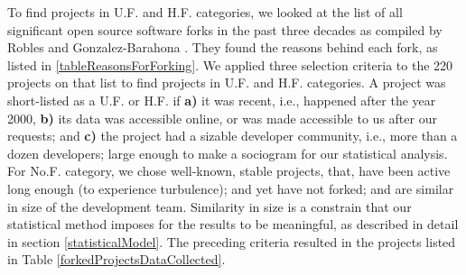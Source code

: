 \documentclass{report}
\begin{document}
To find projects in U.F. and H.F. categories, we looked at the list of all significant open source software forks in the past three decades as compiled by Robles and Gonzalez-Barahona \cite{Robles}. They found the reasons behind each fork, as listed in \ref{tableReasonsForForking}. We applied three selection criteria to the 220 projects on that list to find projects in U.F. and H.F. categories. A project was short-listed as a U.F. or H.F. if \textbf{a)} it was recent, i.e., happened after the year 2000, \textbf{b)} its data was accessible online, or was made accessible to us after our requests; and \textbf{c)} the project had a sizable developer community, i.e., more than a dozen developers; large enough to make a sociogram for our statistical analysis. For No.F. category, we chose well-known, stable projects, that,  have been active long enough (to experience turbulence); and yet have not forked; and are similar in size of the development team. Similarity in size is a constrain that our statistical method imposes for the results to be meaningful, as described in detail in section \ref{statisticalModel}.  The preceding criteria resulted in the projects listed in Table \ref{forkedProjectsDataCollected}. 
\end{document}
